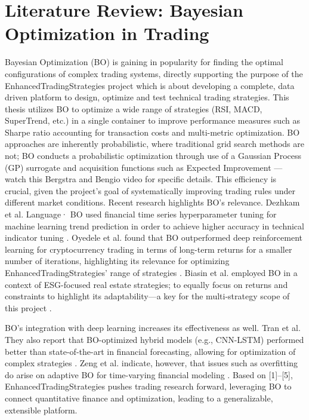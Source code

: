 \section{Literature Review: Bayesian Optimization in Trading}
Bayesian Optimization (BO) is gaining in popularity for finding the optimal configurations of complex trading systems, directly supporting the purpose of the EnhancedTradingStrategies project which is about developing a complete, data driven platform to design, optimize and test technical trading strategies. This thesis utilizes BO to optimize a wide range of strategies (RSI, MACD, SuperTrend, etc.) in a single container to improve performance measures such as Sharpe ratio accounting for transaction costs and multi-metric optimization. BO approaches are inherently probabilistic, where traditional grid search methods are not; BO conducts a probabilistic optimization through use of a Gaussian Process (GP) surrogate and acquisition functions such as Expected Improvement — watch this Bergstra and Bengio video for specific details. This efficiency is crucial, given the project's goal of systematically improving trading rules under different market conditions. Recent research highlights BO's relevance. Dezhkam et al. Language· BO used financial time series hyperparameter tuning for machine learning trend prediction in order to achieve higher accuracy in technical indicator tuning \cite{dezhkam_bayesian_2023}. Oyedele et al. found that BO outperformed deep reinforcement learning for cryptocurrency trading in terms of long-term returns for a smaller number of iterations, highlighting its relevance for optimizing EnhancedTradingStrategies' range of strategies \cite{oyedele_bayesian_2023}. Biasin et al. employed BO in a context of ESG-focused real estate strategies; to equally focus on returns and constraints to highlight its adaptability—a key for the multi-strategy scope of this project \cite{biasin_esg_2024}.

BO's integration with deep learning increases its effectiveness as well. Tran et al. They also report that BO-optimized hybrid models (e.g., CNN-LSTM) performed better than state-of-the-art in financial forecasting, allowing for optimization of complex strategies \cite{tran_cnn_lstm_2023}. Zeng et al. indicate, however, that issues such as overfitting do arise on adaptive BO for time-varying financial modeling \cite{zeng_adaptive_2025}. Based on [1]–[5], EnhancedTradingStrategies pushes trading research forward, leveraging BO to connect quantitative finance and optimization, leading to a generalizable, extensible platform.


